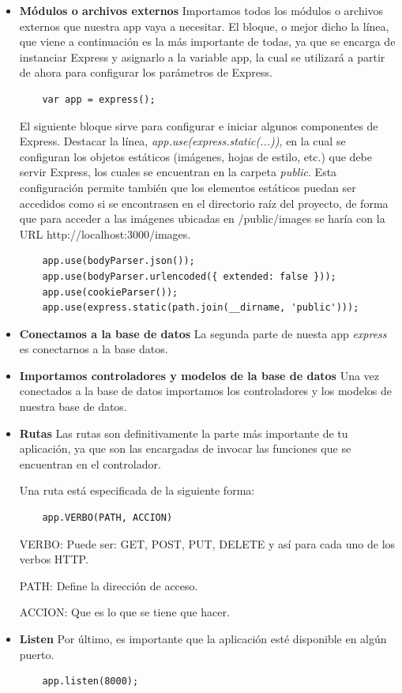 \begin{itemize}

    \item \textbf{Módulos o archivos externos} Importamos todos los módulos o archivos externos que nuestra app vaya a necesitar. El bloque, o mejor dicho la línea, que viene a continuación es la más importante de todas, ya que se encarga de instanciar Express y asignarlo a la variable app, la cual se utilizará a partir de ahora para configurar los parámetros de Express.

    \begin{lstlisting}
    var app = express();
   \end{lstlisting}

   El siguiente bloque sirve para configurar e iniciar algunos componentes de Express. Destacar la línea, \textit{app.use(express.static(...))}, en la cual se configuran los objetos estáticos (imágenes, hojas de estilo, etc.) que debe servir Express, los cuales se encuentran en la carpeta \textit{public}. Esta configuración permite también que los elementos estáticos puedan ser accedidos como si se encontrasen en el directorio raíz del proyecto, de forma que para acceder a las imágenes ubicadas en /public/images se haría con la URL http://localhost:3000/images.
    \begin{lstlisting}
    app.use(bodyParser.json());
    app.use(bodyParser.urlencoded({ extended: false }));
    app.use(cookieParser());
    app.use(express.static(path.join(__dirname, 'public')));
   \end{lstlisting}


    \item \textbf{Conectamos a la base de datos} La segunda parte de nuesta app \textit{express} es conectarnos a la base datos.

    \item \textbf{Importamos controladores y modelos de la base de datos} Una vez conectados a la base de datos importamos los controladores y los modelos de nuestra base de datos.


   \item \textbf{Rutas} Las rutas son definitivamente la parte más importante de tu aplicación, ya que son las encargadas de invocar las funciones que se encuentran en el controlador.

   Una ruta está especificada de la siguiente forma:
   \begin{lstlisting}
    app.VERBO(PATH, ACCION)
   \end{lstlisting}

   VERBO: Puede ser: GET, POST, PUT, DELETE y así para cada uno de los verbos HTTP.

   PATH: Define la dirección de acceso.

   ACCION: Que es lo que se tiene que hacer.

   \item \textbf{Listen} Por último, es importante que la aplicación esté disponible en algún puerto.
   \begin{lstlisting}
    app.listen(8000);
   \end{lstlisting}

\end{itemize}

